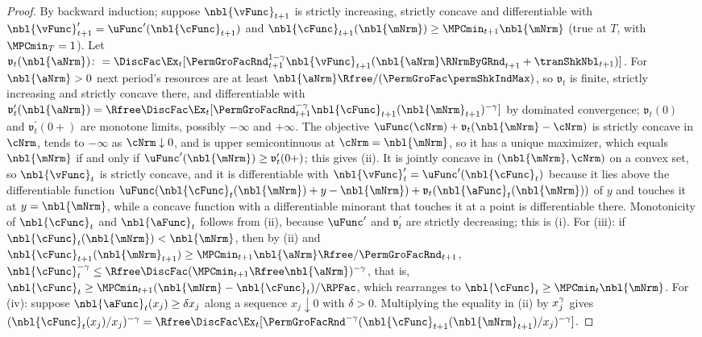 \documentclass[\econtexRoot/BufferStockTheory]{subfiles}
\begin{document}
\begin{proof}
By backward induction; suppose $\nbl{\vFunc}_{t+1}$ is strictly increasing, strictly concave and differentiable with $\nbl{\vFunc}_{t+1}^{\prime}=\uFunc^{\prime}(\nbl{\cFunc}_{t+1})$ and $\nbl{\cFunc}_{t+1}(\nbl{\mNrm})\geq\MPCmin_{t+1}\nbl{\mNrm}$ (true at $T$, with $\MPCmin_{T}=1$).
Let $\mathfrak{v}_{t}(\nbl{\aNrm})\colon=\DiscFac\Ex_{t}[\PermGroFacRnd_{t+1}^{1-\CRRA}\nbl{\vFunc}_{t+1}(\nbl{\aNrm}\RNrmByGRnd_{t+1}+\tranShkNbl_{t+1})]$.
For $\nbl{\aNrm}>0$ next period's resources are at least $\nbl{\aNrm}\Rfree/(\PermGroFac\permShkIndMax)$, so $\mathfrak{v}_{t}$ is finite, strictly increasing and strictly concave there, and differentiable with $\mathfrak{v}_{t}^{\prime}(\nbl{\aNrm})=\Rfree\DiscFac\Ex_{t}[\PermGroFacRnd_{t+1}^{-\CRRA}\nbl{\cFunc}_{t+1}(\nbl{\mNrm}_{t+1})^{-\CRRA}]$ by dominated convergence; $\mathfrak{v}_{t}(0)$ and $\mathfrak{v}_{t}^{\prime}(0+)$ are monotone limits, possibly $-\infty$ and $+\infty$.
The objective $\uFunc(\cNrm)+\mathfrak{v}_{t}(\nbl{\mNrm}-\cNrm)$ is strictly concave in $\cNrm$, tends to $-\infty$ as $\cNrm\downarrow 0$, and is upper semicontinuous at $\cNrm=\nbl{\mNrm}$, so it has a unique maximizer, which equals $\nbl{\mNrm}$ if and only if $\uFunc^{\prime}(\nbl{\mNrm})\geq\mathfrak{v}_{t}^{\prime}(0+)$; this gives (ii).
It is jointly concave in $(\nbl{\mNrm},\cNrm)$ on a convex set, so $\nbl{\vFunc}_{t}$ is strictly concave, and it is differentiable with $\nbl{\vFunc}_{t}^{\prime}=\uFunc^{\prime}(\nbl{\cFunc}_{t})$ because it lies above the differentiable function $\uFunc(\nbl{\cFunc}_{t}(\nbl{\mNrm})+y-\nbl{\mNrm})+\mathfrak{v}_{t}(\nbl{\aFunc}_{t}(\nbl{\mNrm}))$ of $y$ and touches it at $y=\nbl{\mNrm}$, while a concave function with a differentiable minorant that touches it at a point is differentiable there.
Monotonicity of $\nbl{\cFunc}_{t}$ and $\nbl{\aFunc}_{t}$ follows from (ii), because $\uFunc^{\prime}$ and $\mathfrak{v}_{t}^{\prime}$ are strictly decreasing; this is (i).
For (iii): if $\nbl{\cFunc}_{t}(\nbl{\mNrm})<\nbl{\mNrm}$, then by (ii) and $\nbl{\cFunc}_{t+1}(\nbl{\mNrm}_{t+1})\geq\MPCmin_{t+1}\nbl{\aNrm}\Rfree/\PermGroFacRnd_{t+1}$, $\nbl{\cFunc}_{t}^{-\CRRA}\leq\Rfree\DiscFac(\MPCmin_{t+1}\Rfree\nbl{\aNrm})^{-\CRRA}$, that is, $\nbl{\cFunc}_{t}\geq\MPCmin_{t+1}(\nbl{\mNrm}-\nbl{\cFunc}_{t})/\RPFac$, which rearranges to $\nbl{\cFunc}_{t}\geq\MPCmin_{t}\nbl{\mNrm}$.
For (iv): suppose $\nbl{\aFunc}_{t}(x_{j})\geq\delta x_{j}$ along a sequence $x_{j}\downarrow 0$ with $\delta>0$.
Multiplying the equality in (ii) by $x_{j}^{\gamma}$ gives $(\nbl{\cFunc}_{t}(x_{j})/x_{j})^{-\CRRA}=\Rfree\DiscFac\Ex_{t}[\PermGroFacRnd^{-\CRRA}(\nbl{\cFunc}_{t+1}(\nbl{\mNrm}_{t+1})/x_{j})^{-\CRRA}]$.

\end{proof}
\end{document}
